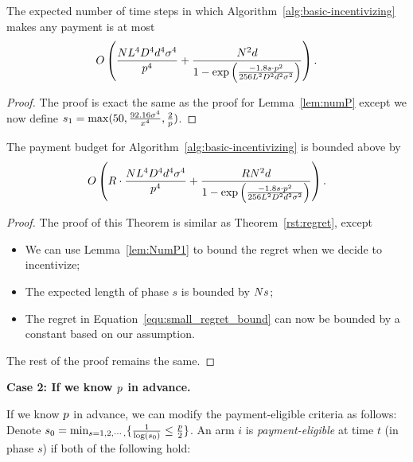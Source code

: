 \begin{lemma}  \label{lem:NumP1}
The expected number of time steps in which
Algorithm~\ref{alg:basic-incentivizing}
makes any payment is at most 
\begin{align}
O\left(\frac{N L^4 D^4 d^4 \sigma^4}{p^4}
  + \frac{N^2 d}{1 - \exp \left(
    \frac{-1.8 s \cdot p^2}{256 L^2 D^2 d^2 \sigma^2}
  \right)} \right). \nonumber 
\end{align}
\end{lemma}

\begin{proof}
The proof is exact the same as the proof for Lemma~\ref{lem:numP} except we now define $s_1 = \max(50, \frac{92.16 \sigma^4}{x^4}, \frac{2}{p})$.
\end{proof}


\begin{theorem}
The payment budget for Algorithm~\ref{alg:basic-incentivizing} is bounded above by 
\begin{align}
O \left(R\cdot \frac{N L^4 D^4 d^4 \sigma^4}{p^4}
  + \frac{R N^2 d}{1 - \exp \left(
    \frac{-1.8 s \cdot p^2}{256 L^2 D^2 d^2 \sigma^2}
  \right)} \right).  \nonumber
\end{align}
\end{theorem}

\begin{proof}
The proof of this Theorem is similar as Theorem~\ref{rst:regret}, except
\begin{itemize}
\item We can use Lemma~\ref{lem:NumP1} to bound the regret when we decide to incentivize;
\item The expected length of phase $s$ is bounded by $N s$;
\item The regret in Equation~\ref{equ:small_regret_bound} can now be bounded by a constant based on our assumption.
\end{itemize}
The rest of the proof remains the same.
\end{proof}




\textbf{Case 2: If we know $p$ in advance.}

If we know $p$ in advance, we can modify the payment-eligible criteria as follows: Denote $s_0=\min_{s=1,2,\cdots,}\{\frac{1}{\log(s_0)}\leq \frac{p}{2}\}$. An arm $i$ is \emph{payment-eligible} at time $t$ (in phase $s$)
if both of the following hold:

